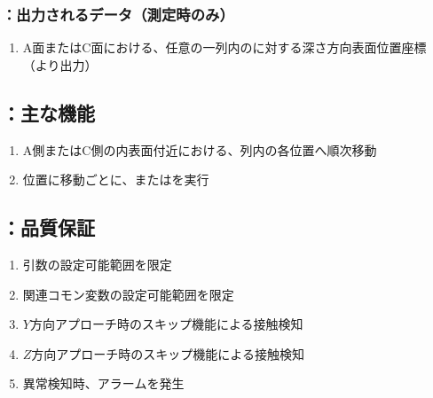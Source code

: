 \subsubsection{\DLtwoAC：出力されるデータ（測定時のみ）}
\begin{enumerate}[label*=\sarrow]
\item A面またはC面における、任意の一列内の\Dimple に対する深さ方向表面位置座標\\
（\DMLthreeAC より出力）
\end{enumerate}


\subsection{\DLtwoAC：主な機能}
\begin{enumerate}[label*=\sarrow]
\item A側またはC側の内表面付近における、列内の各\Dimple 位置へ順次移動
\item \Dimple 位置に移動ごとに、\DMLthreeAC または\DKLthreeAC を実行
\end{enumerate}


\subsection{\DLtwoAC：品質保証}
\begin{enumerate}[label*=\sarrow]
\item {}引数の設定可能範囲を限定
\item 関連コモン変数の設定可能範囲を限定
\item $Y$方向アプローチ時のスキップ機能による接触検知
\item $Z$方向アプローチ時のスキップ機能による接触検知
\item 異常検知時、アラームを発生
\end{enumerate}



